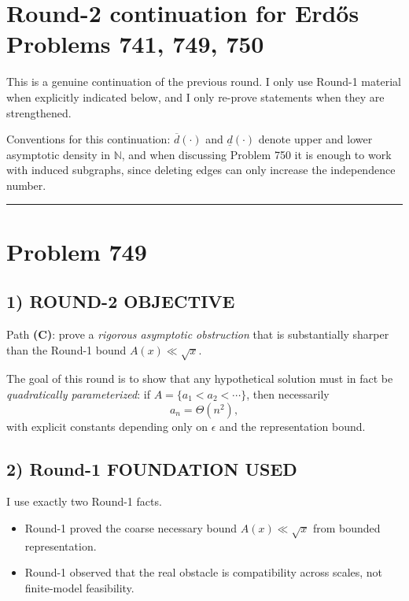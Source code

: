 \section*{Round-2 continuation for Erd\H{o}s Problems 741, 749, 750}

\noindent
This is a genuine continuation of the previous round. I only use Round-1 material when explicitly indicated below, and I only re-prove statements when they are strengthened.

\medskip
\noindent
Conventions for this continuation: $\overline d(\cdot)$ and $\underline d(\cdot)$ denote upper and lower asymptotic density in $\mathbb N$, and when discussing Problem 750 it is enough to work with induced subgraphs, since deleting edges can only increase the independence number.


\bigskip
\hrule
\bigskip

\section*{Problem 749}

\subsection*{1) ROUND-2 OBJECTIVE}

Path \textbf{(C)}: prove a \emph{rigorous asymptotic obstruction} that is substantially sharper than the Round-1 bound $A(x)\ll \sqrt{x}$.

The goal of this round is to show that any hypothetical solution must in fact be \emph{quadratically parameterized}:
if $A=\{a_1<a_2<\cdots\}$, then necessarily
\[
a_n=\Theta(n^2),
\]
with explicit constants depending only on $\epsilon$ and the representation bound.

\subsection*{2) Round-1 FOUNDATION USED}

I use exactly two Round-1 facts.

\begin{itemize}
\item Round-1 proved the coarse necessary bound $A(x)\ll \sqrt{x}$ from bounded representation.
\item Round-1 observed that the real obstacle is compatibility across scales, not finite-model feasibility.
\end{itemize}

